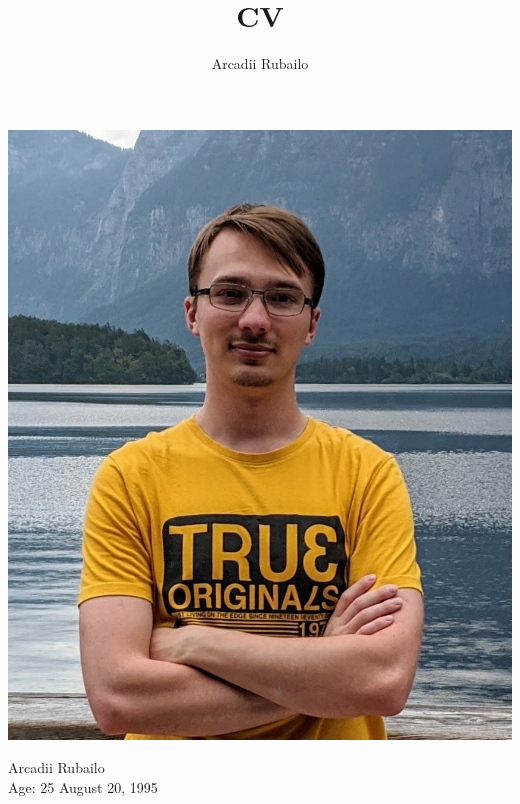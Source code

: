 \documentclass[12pt, a4paper]{article}
\title{CV}
\author{Arcadii Rubailo}
\begin{document}
\begin{minipage}{0.3\textwidth}

    \includegraphics[width=\textwidth]{profile}
    
    Arcadii Rubailo \\
    Age: 25 August 20, 1995
    
    \hfill
    

\end{minipage}
\end{document}
